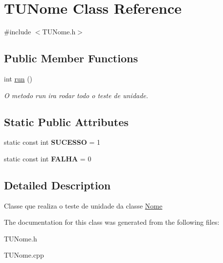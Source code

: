 \hypertarget{classTUNome}{}\section{T\+U\+Nome Class Reference}
\label{classTUNome}


{\ttfamily \#include $<$T\+U\+Nome.\+h$>$}

\subsection*{Public Member Functions}
\begin{DoxyCompactItemize}
\item 
int \hyperlink{classTUNome_ae20734cb15f71890e57aff02a00f6313}{run} ()\hypertarget{classTUNome_ae20734cb15f71890e57aff02a00f6313}{}\label{classTUNome_ae20734cb15f71890e57aff02a00f6313}

\begin{DoxyCompactList}\small\item\em O metodo run ira rodar todo o teste de unidade. \end{DoxyCompactList}\end{DoxyCompactItemize}
\subsection*{Static Public Attributes}
\begin{DoxyCompactItemize}
\item 
static const int {\bfseries S\+U\+C\+E\+S\+SO} = 1\hypertarget{classTUNome_af1d3faa5a4f6a302f96d193478f3013b}{}\label{classTUNome_af1d3faa5a4f6a302f96d193478f3013b}

\item 
static const int {\bfseries F\+A\+L\+HA} = 0\hypertarget{classTUNome_a50bf8928bc5e773eaf15a2fb5eb2f065}{}\label{classTUNome_a50bf8928bc5e773eaf15a2fb5eb2f065}

\end{DoxyCompactItemize}


\subsection{Detailed Description}
Classe que realiza o teste de unidade da classe \hyperlink{classNome}{Nome} 

The documentation for this class was generated from the following files\+:\begin{DoxyCompactItemize}
\item 
T\+U\+Nome.\+h\item 
T\+U\+Nome.\+cpp\end{DoxyCompactItemize}
